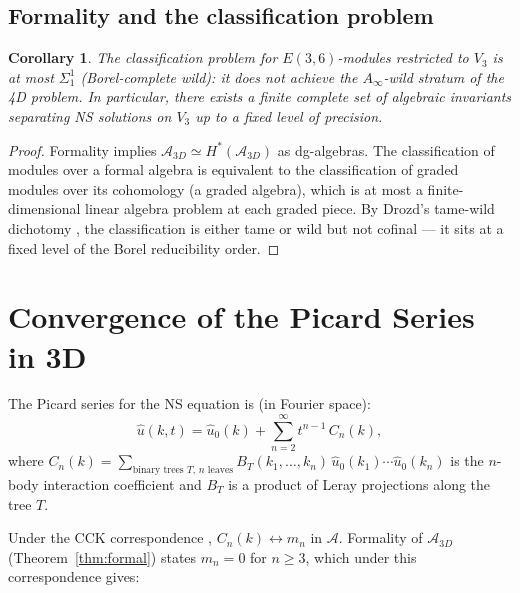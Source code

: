 \documentclass[reqno,10pt]{amsart}
\theoremstyle{plain}
\newtheorem{corollary}[theorem]{Corollary}
\theoremstyle{definition}
\def\gEiii{E(3,6)}
\begin{document}
\subsection{Formality and the classification problem}

\begin{corollary}\label{cor:classifiable}
  The classification problem for $\gEiii$-modules restricted to $V_3$ is
  at most $\Sigma_1^1$ (Borel-complete wild): it does not achieve the
  $A_\infty$-wild stratum of the 4D problem.
  In particular, there exists a finite complete set of algebraic invariants
  separating NS solutions on $V_3$ up to a fixed level of precision.
\end{corollary}

\begin{proof}
  Formality implies $\mathcal{A}_{3D} \simeq H^*(\mathcal{A}_{3D})$ as
  dg-algebras.  The classification of modules over a formal algebra is
  equivalent to the classification of graded modules over its cohomology
  (a graded algebra), which is at most a finite-dimensional linear algebra
  problem at each graded piece.  By Drozd's tame-wild dichotomy
  \cite{Drozd1979}, the classification is either tame or wild but not
  cofinal — it sits at a fixed level of the Borel reducibility order.
\end{proof}

\section{Convergence of the Picard Series in 3D}\label{sec:picard}

The Picard series for the NS equation is (in Fourier space):
\begin{equation}\label{eq:picard}
  \hat{u}(k,t) = \hat{u}_0(k) + \sum_{n=2}^\infty t^{n-1}\,C_n(k),
\end{equation}
where $C_n(k) = \sum_{\text{binary trees }T,\,n\text{ leaves}}
B_T(k_1,\ldots,k_n)\,\hat{u}_0(k_1)\cdots\hat{u}_0(k_n)$
is the $n$-body interaction coefficient and $B_T$ is a product of
Leray projections along the tree $T$.

Under the CCK correspondence \cite{CCK2026}, $C_n(k) \leftrightarrow m_n$
in $\mathcal{A}$.  Formality of $\mathcal{A}_{3D}$ (Theorem~\ref{thm:formal})
states $m_n = 0$ for $n \geq 3$, which under this correspondence gives:
\end{document}

